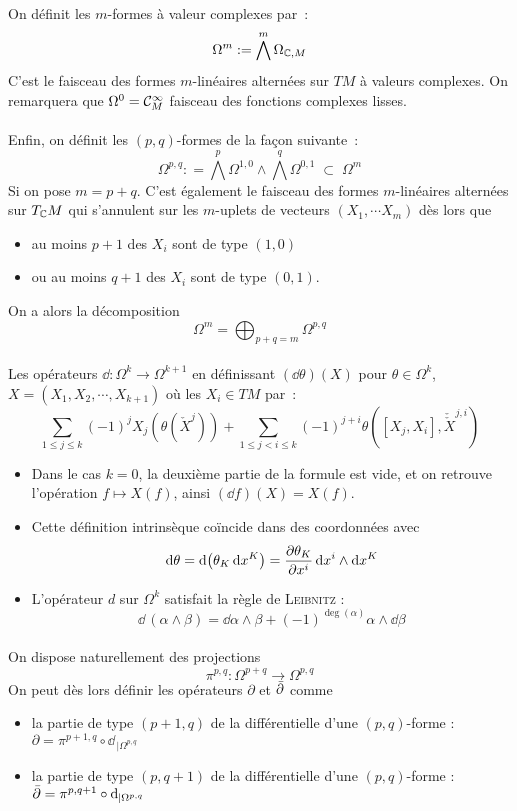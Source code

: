 \documentclass[12pt,draft]{article}
\begin{document}
\paragraph{} On définit les $m$-formes à valeur complexes par~:
\[
\Omega^m := \bigwedge^m \Omega_{\mathbb{C},M}
\]
C'est le faisceau des formes $m$-linéaires alternées sur $TM$ à valeurs complexes. On remarquera que $\Omega^0 = \mathcal{C}^\infty_M$ faisceau des fonctions complexes lisses.
\paragraph{ \label{forme_type}} Enfin, on définit les $(p,q)$-formes de la façon suivante~:
\[
\Omega^{p,q} : = \bigwedge^p \Omega^{1,0}  \wedge \bigwedge^q \Omega^{0,1} \; \subset \; \Omega^m
\]
Si on pose $m=p+q$. C'est également le faisceau des formes $m$-linéaires alternées sur $T_{\mathbb{C}} M$ qui s'annulent sur les $m$-uplets de vecteurs $(X_1,\cdots X_{m})$ dès lors que
\begin{itemize}
\item au moins $p+1$ des $X_i$ sont de type $(1,0)$
\item ou au moins $q+1$ des $X_i$ sont de type $(0,1)$.
\end{itemize}
On a alors la décomposition
\[
\Omega^m = \bigoplus_{p+q = m} \Omega^{p,q}
\]
\paragraph{} Les opérateurs $\dd : \Omega^k \rightarrow \Omega^{k+1}$ en définissant $(\dd \theta)(X)$ pour $\theta \in  \Omega^k$, $X=(X_1,X_2, \cdots , X_{k+1})$ où les $X_i \in TM$ par~:
\[
\sum_{1 \leq j \leq k} (−1)^j X_j\left(\theta\left(\check{X}^j\right)\right)+
\sum_{1 \leq j < i \leq k} (−1)^{j+i} \theta\left([X_j,X_i ], \check{\check{X}}^{j,i} \right)
\]
\begin{itemize}
\item Dans le cas $k=0$, la deuxième partie de la formule est vide, et on retrouve l’opération $f \mapsto X(f)$, ainsi $(\dd f)(X) = X(f)$.
\item Cette définition intrinsèque coïncide dans des coordonnées avec
\[
\operatorname{d\!} \theta = \operatorname{d\!} \left(\theta_K \operatorname{d\!} x^K\right) = \dfrac{\partial{\theta_K}}{\partial{x^i}}\operatorname{d\!} x^i \wedge \operatorname{d\!} x^K
\]
\item L’opérateur $d$ sur $ \Omega^k$ satisfait la règle de \textsc{Leibnitz} : 
\[
\dd\,(\alpha \wedge \beta) = \dd \alpha \wedge \beta +(-1)^{\deg(\alpha)} \alpha \wedge \dd \beta
\]
\end{itemize}
\paragraph{} On dispose naturellement des projections
\[
\pi^{p,q} : \Omega^{p+q} \longrightarrow \Omega^{p,q}
\]
On peut dès lors définir les opérateurs $\partial$ et $\operatorname{\bar{\partial}}$ comme
\begin{itemize}
\item la partie de type $(p+1,q)$ de la différentielle d'une $(p,q)$-forme : $\partial = \pi^{p+1,q} \circ \dd_{\,\vert \Omega^{p,q}}$
\item la partie de type $(p,q+1)$ de la différentielle d'une $(p,q)$-forme : $\operatorname{\bar{\partial}} = \pi^{p,q+1} \circ \operatorname{d\!}_{\,\vert \Omega^{p,q}}$
\end{itemize}
\end{document}

